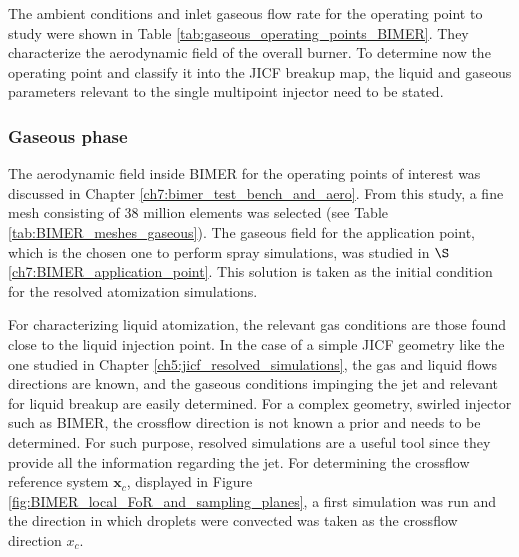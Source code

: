 The ambient conditions and inlet gaseous flow rate for the operating point to study were shown in Table \ref{tab:gaseous_operating_points_BIMER}. They characterize the aerodynamic field of the overall burner. To determine now the operating point and classify it into the JICF breakup map, the liquid and gaseous parameters relevant to the single multipoint injector need to be stated.

\clearpage

\subsubsection*{Gaseous phase}



The aerodynamic field inside BIMER for the operating points of interest was discussed in Chapter \ref{ch7:bimer_test_bench_and_aero}. From this study, a fine mesh consisting of 38 million elements was selected (see Table \ref{tab:BIMER_meshes_gaseous}). The gaseous field for the application point, which is the chosen one to perform spray simulations, was studied in $\S$\ref{ch7:BIMER_application_point}. This solution is taken as the initial condition for the resolved atomization simulations.

For characterizing liquid atomization, the relevant gas conditions are those found close to the liquid injection point. In the case of a simple JICF geometry like the one studied in Chapter \ref{ch5:jicf_resolved_simulations}, the gas and liquid flows directions are known, and the gaseous conditions impinging the jet and relevant for liquid breakup are easily determined. For a complex geometry, swirled injector such as BIMER, the crossflow direction is not known a prior and needs to be determined. For such purpose, resolved simulations are a useful tool since they provide all the information regarding the jet. For determining the crossflow reference system $\textbf{x}_c$, displayed in Figure \ref{fig:BIMER_local_FoR_and_sampling_planes},  a first simulation was run and the direction in which droplets were convected was taken as the crossflow direction $x_c$. 


